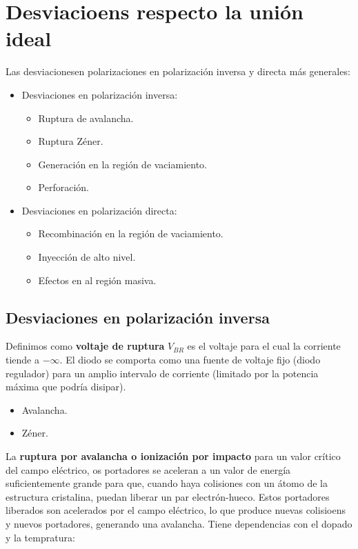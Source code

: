 \section{Desviacioens respecto la unión ideal}

Las desviacionesen polarizaciones en polarización inversa y directa más generales: 

\begin{itemize}
    \item Desviaciones en polarización inversa:
    \begin{itemize}
        \item Ruptura de avalancha.
        \item Ruptura Zéner.
        \item Generación en la región de vaciamiento.
        \item Perforación.
    \end{itemize}
    \item Desviaciones en polarización directa: 
    \begin{itemize}
        \item Recombinación en la región de vaciamiento.
        \item Inyección de alto nivel.
        \item Efectos en al región masiva.
    \end{itemize}
\end{itemize}

\subsection{Desviaciones en polarización inversa}

Definimos como \textbf{voltaje de ruptura} $V_{BR}$ es el voltaje para el cual la corriente tiende a $-\infty$. El diodo se comporta como una fuente de voltaje fijo (diodo regulador) para un amplio intervalo de corriente (limitado por la potencia máxima que podría disipar). 

\begin{itemize}
    \item Avalancha.
    \item Zéner.
\end{itemize}

La \textbf{ruptura por avalancha o ionización por impacto} para un valor crítico del campo eléctrico, os portadores se aceleran a un valor de energía suficientemente grande para que, cuando haya colisiones con un átomo de la estructura cristalina, puedan liberar un par electrón-hueco. Estos portadores liberados son acelerados por el campo eléctrico, lo que produce nuevas colisioens y nuevos portadores, generando una avalancha. Tiene dependencias con el dopado y la tempratura: 

